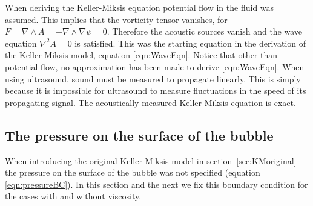 \documentclass[10pt, fleqn,draft,showtrims,oldfontcommands]{article} %
\newcommand{\secref}[1]{section~\ref{sec:#1}}
\newcommand{\eqnref}[1]{\ref{eqn:#1}}
\newcommand{\del}{\nabla}
\begin{document}
When deriving the Keller-Miksis equation potential flow in the fluid was assumed.
This implies that the vorticity tensor vanishes, for
$F = \del \wedge A = -\del \wedge \del \psi = 0$.
Therefore the acoustic sources vanish and the wave equation $\del^2 A =0$ is satisfied.
This was the starting equation in the derivation of the Keller-Miksis model, 
equation \eqnref{WaveEqn}. 
Notice that other than potential flow, no approximation  has been made to derive \eqnref{WaveEqn}.
When using ultrasound, sound must be measured to propagate linearly.
This is simply because it is impossible for ultrasound to measure fluctuations in the speed of its propagating signal.
The acoustically-measured-Keller-Miksis equation is exact.




\subsection{The pressure on the surface of the bubble}\label{sec:surface_pressure}

When introducing the original Keller-Miksis model in \secref{KMoriginal} the pressure on the surface of the bubble was not specified (equation \eqnref{pressureBC}).
In this section and the next we fix this boundary condition for the cases with and without viscosity.
\end{document}
